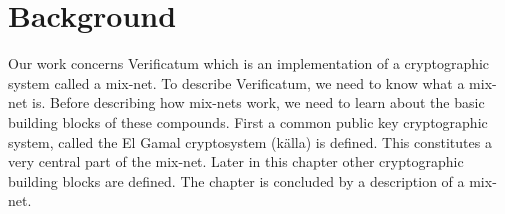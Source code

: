\section{Background}

Our work concerns Verificatum which is an implementation of a cryptographic system called a mix-net. To describe Verificatum, we need to know what a mix-net is. Before describing how mix-nets work, we need to learn about the basic building blocks of these compounds. First a common public key cryptographic system, called the El Gamal cryptosystem (källa) is defined. This constitutes a very central part of the mix-net. Later in this chapter other cryptographic building blocks are defined. The chapter is concluded by a description of a mix-net.




